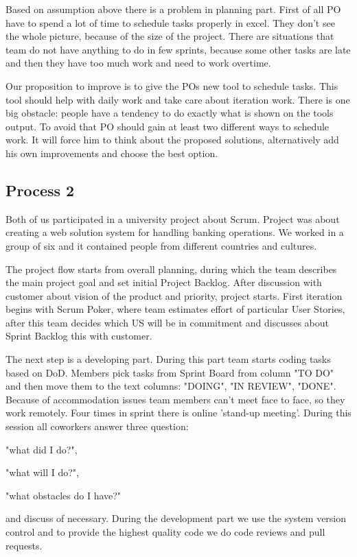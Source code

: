 Based on assumption above there is a problem in planning part. First of all PO have to spend a lot of time to schedule tasks properly in excel. They don't see the whole picture, because of the size of the project. There are situations that team do not have anything to do in few sprints, because some other tasks are late and then they have too much work and need to work overtime. 

Our proposition to improve is to give the POs new tool to schedule tasks. This tool should help with daily work and take care about iteration work. There is one big obstacle: people have a tendency to do exactly what is shown on the tools output. To avoid that PO should gain at least two different ways to schedule work. It will force him to think about the proposed solutions, alternatively add his own improvements and choose the best option. 

\subsection*{Process 2}

Both of us participated in a university project about Scrum. Project was about creating a web solution system for handling banking operations. We worked in a group of six and it contained people from different countries and cultures. 

The project flow starts from overall planning, during which the team describes the main project goal and set initial Project Backlog. After discussion with customer about vision of the product and priority, project starts. First iteration begins with Scrum Poker, where team estimates effort of particular User Stories, after this team decides which US will be in commitment and discusses about Sprint Backlog this with customer.

The next step is a developing part. During this part team starts coding tasks based on DoD. Members pick tasks from Sprint Board from column "TO DO" and then move them to the text columns: "DOING", "IN REVIEW", "DONE". Because of accommodation issues team members can't meet face to face, so they work remotely. Four times in sprint there is online 'stand-up meeting'. During this session all coworkers answer three question:
\begin{inparaenum}
\item "what did I do?",
\item "what will I do?",
\item "what obstacles do I have?"
\end{inparaenum} and discuss of necessary.
During the development part we use the system version control and to provide the highest quality code we do code reviews and pull requests. 

